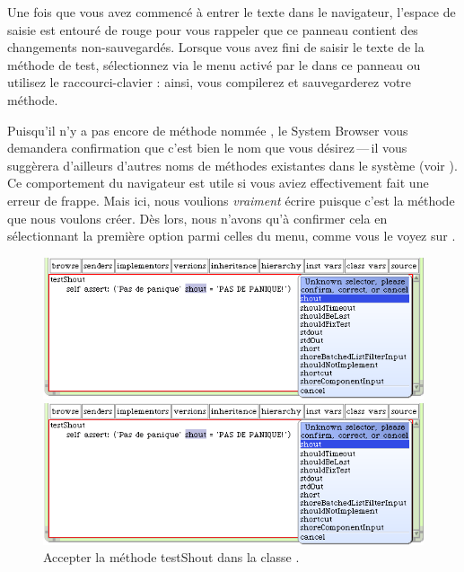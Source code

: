 \documentclass[a4paper,10pt,twoside]{book}
\begin{document}
Une fois que vous avez commenc\'e \`a entrer le texte dans le
navigateur, l'espace de saisie est entour\'e de rouge pour vous
rappeler que ce panneau contient des changements non-sauvegard\'es.
Lorsque vous avez fini de saisir le texte de la m\'ethode de test,
s\'electionnez  via le menu activ\'e par le
 dans ce panneau ou utilisez le raccourci-clavier
: ainsi, vous compilerez et sauvegarderez votre m\'ethode.

Puisqu'il n'y a pas encore de m\'ethode nomm\'ee , le System
Browser vous demandera confirmation que c'est bien le nom que vous
d\'esirez\,---\,il vous sugg\`erera d'ailleurs d'autres noms de
m\'ethodes existantes dans le syst\`eme (voir ).
Ce comportement du navigateur est utile si vous aviez effectivement
fait une erreur de frappe. Mais ici, nous voulions \emph{vraiment}
\'ecrire  puisque c'est la m\'ethode que nous voulons
cr\'eer. D\`es lors, nous n'avons qu'\`a confirmer cela en
s\'electionnant la premi\`ere option parmi celles du menu, comme vous
le voyez sur . 

\begin{figure}[hbt]
\ifluluelse
	{\centerline {\includegraphics[width=\textwidth]{testShoutConfirm}}}
	{\centerline {\includegraphics[scale=0.7]{testShoutConfirm}}}
\caption{Accepter la m\'ethode testShout dans la classe .
\label{fig:testShoutConfirm}}
\end{figure}
\end{document}

